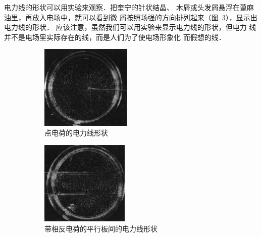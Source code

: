电力线的形状可以用实验来观察．把奎宁的针状结晶、
木屑或头发屑悬浮在蓖麻油里，再放入电场中，就可以看到微
屑按照场强的方向排列起来（图~\ref{fig_B_6-8}），显示出电力线的形状．
应该注意，虽然我们可以用实验来显示电力线的形状，但电力
线并不是电场里实际存在的线，而是人们为了使电场形象化
而假想的线．
\begin{figure}[htbp]\centering
    \begin{subfigure}{0.4\linewidth}
        \centering
        \includegraphics[height=4cm]{fig/B/6-8a.jpg}
        \caption{点电荷的电力线形状}\label{fig_B_6-8a}
    \end{subfigure}
    \hfil
    \begin{subfigure}{0.4\linewidth}
        \centering
        \includegraphics[height=4cm]{fig/B/6-8b.jpg}
        \caption{带相反电荷的平行板间的电力线形状}\label{fig_B_6-8b}
    \end{subfigure}
    \caption{}\label{fig_B_6-8}
\end{figure}

